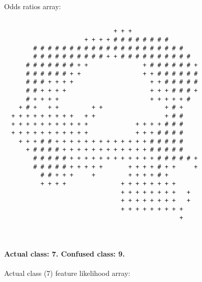 \begin{multicols*}{2}
\begin{Verbatim}[samepage=true]
\end{Verbatim}
Odds ratios array:
\begin{Verbatim}[samepage=true]
                                                        
                              + + +                     
                      + + + + # # # # # # # #           
        # # # # # # # # # # # # # # # # # # # # #       
        # # # # # # # # # # + + # # # # # # # # # #     
      # # # # # # # + +               + # # # # # # +   
      # # # # # # + +                 + + # # # # # #   
      # # # + + + +                     + + # # # # #   
      # # + + + +                       + + + # # # +   
      # + + + +                         + + + + + #     
    + # +   + +         + +                 + # +       
  + + + + + + + + +   + +                   + # #       
  + + + + + + + + + + +             + + + + # # #       
  + + + + + + + + + + +             + + + # # # #       
    + + + # # + + + + + + + + + + + + + # # # # #       
      + # # # # + + + + + + + + + + + + # # # # #       
        # # # # # + + + + + + + + + + + + # # # # # +   
        # # # # # + + + + +       + + + + # + +     +   
          # # + + +     +         + + + + # +           
          + + + +               + + + + + + + +         
                                + + + + + + + +   +     
                                + + + + + + + +   +     
                                + + + + + + + + +       
                                                +       
                                                        
                                                        
\end{Verbatim}
\columnbreak
\paragraph{Actual class: 7. Confused class: 9. \\}
Actual class (7) feature likelihood array:
\begin{Verbatim}[samepage=true]
                                                        

\end{Verbatim}
\end{multicols*}
